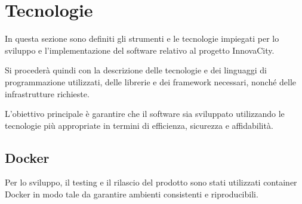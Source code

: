 \section{Tecnologie}
In questa sezione sono definiti gli strumenti e le tecnologie impiegati per lo sviluppo e l'implementazione del software relativo al progetto InnovaCity.

Si procederà quindi con la descrizione delle tecnologie e dei linguaggi di programmazione utilizzati, delle librerie e dei framework necessari, nonché delle infrastrutture richieste.

L'obiettivo principale è garantire che il software sia sviluppato utilizzando le tecnologie più appropriate in termini di efficienza, sicurezza e affidabilità.

\subsection{Docker}\label{sec:docker}
Per lo sviluppo, il testing e il rilascio del prodotto sono stati utilizzati container Docker in modo tale da garantire ambienti consistenti e riproducibili.

